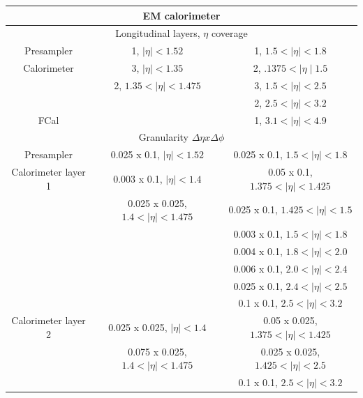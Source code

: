 \begin{table}
  \centering
  \begin{tabular}{ |c|c|c|}
  \hline
  \multicolumn{3}{|c|}{\textbf{EM calorimeter}} \\
  \hline
  \hline
  \multicolumn{3}{|c|}{Longitudinal layers, $\eta$ coverage} \\
  \hline
  Presampler  & 1, $\mid\eta\mid<1.52$            & 1, $1.5<\mid\eta\mid<1.8$ \\
  \hline
  Calorimeter & 3, $\mid\eta\mid<1.35$            & 2, $.1375<\mid\eta\mid1.5$ \\
              & 2, $1.35<\mid\eta\mid<1.475$      & 3, $1.5<\mid\eta\mid<2.5$ \\
              &                                   & 2, $2.5<\mid\eta\mid<3.2$ \\
  \hline
  FCal        &                                   & 1, $3.1<\mid\eta\mid < 4.9$ \\
  \hline
  \multicolumn{3}{|c|}{Granularity $\Delta\eta x \Delta\phi$} \\
  \hline
  Presampler  & 0.025 x 0.1, $\mid\eta\mid<1.52$                & 0.025 x 0.1, $1.5<\mid\eta\mid<1.8$ \\
  \hline
  Calorimeter layer 1 & 0.003 x 0.1, $\mid\eta\mid<1.4$         & 0.05 x 0.1,  $1.375<\mid\eta\mid<1.425$ \\
                      & 0.025 x 0.025, $1.4<\mid\eta\mid<1.475$ & 0.025 x 0.1, $1.425<\mid\eta\mid<1.5$ \\
                      &                                         & 0.003 x 0.1, $1.5<\mid\eta\mid<1.8$ \\
                      &                                         & 0.004 x 0.1, $1.8<\mid\eta\mid<2.0$ \\
                      &                                         & 0.006 x 0.1, $2.0<\mid\eta\mid<2.4$ \\
                      &                                         & 0.025 x 0.1, $2.4<\mid\eta\mid<2.5$ \\
                      &                                         & 0.1 x 0.1,   $2.5<\mid\eta\mid<3.2$ \\
  \hline
  Calorimeter layer 2 & 0.025 x 0.025, $\mid\eta\mid<1.4$       & 0.05 x 0.025,$1.375<\mid\eta\mid<1.425$ \\
                      & 0.075 x 0.025, $1.4<\mid\eta\mid<1.475$ & 0.025 x 0.025, $1.425<\mid\eta\mid<2.5$ \\
                      &                                         & 0.1 x 0.1, $2.5<\mid\eta\mid<3.2$ \\

\end{tabular}
\end{table}
